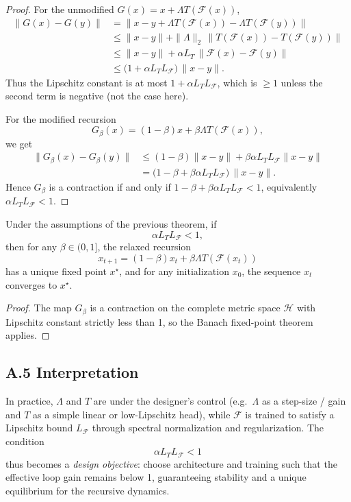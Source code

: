 \documentclass[11pt]{article}
\begin{document}
\begin{proof}
For the unmodified \(G(x) = x + \Lambda T(\mathcal{F}(x))\),
\begin{align*}
  \|G(x) - G(y)\|
  &= \|x-y + \Lambda T(\mathcal{F}(x)) - \Lambda T(\mathcal{F}(y))\| \\
  &\leq \|x-y\|
    + \|\Lambda\|_2 \,\|T(\mathcal{F}(x)) - T(\mathcal{F}(y))\| \\
  &\leq \|x-y\|
    + \alpha L_T \,\|\mathcal{F}(x) - \mathcal{F}(y)\| \\
  &\leq \big(1 + \alpha L_T L_{\mathcal{F}}\big)\,\|x-y\|.
\end{align*}
Thus the Lipschitz constant is at most \(1 + \alpha L_T L_{\mathcal{F}}\), which is \(\geq 1\) unless the second term is negative (not the case here).

For the modified recursion
\[
  G_\beta(x) = (1-\beta)x + \beta \Lambda T(\mathcal{F}(x)),
\]
we get
\begin{align*}
  \|G_\beta(x) - G_\beta(y)\|
  &\leq (1-\beta)\|x-y\|
    + \beta \alpha L_T L_{\mathcal{F}} \|x-y\| \\
  &= \bigl(1-\beta + \beta \alpha L_T L_{\mathcal{F}}\bigr)\,\|x-y\|.
\end{align*}
Hence \(G_\beta\) is a contraction if and only if
\(1-\beta + \beta \alpha L_T L_{\mathcal{F}} < 1\),
equivalently \(\alpha L_T L_{\mathcal{F}} < 1\).
\end{proof}

\begin{corollary}
Under the assumptions of the previous theorem, if
\[
  \alpha L_T L_{\mathcal{F}} < 1,
\]
then for any \(\beta \in (0,1]\), the relaxed recursion
\[
  x_{t+1} = (1-\beta)x_t + \beta \Lambda T(\mathcal{F}(x_t))
\]
has a unique fixed point \(x^\star\), and for any initialization \(x_0\), the sequence \(x_t\) converges to \(x^\star\).
\end{corollary}

\begin{proof}
The map \(G_\beta\) is a contraction on the complete metric space \(\mathcal{H}\) with Lipschitz constant strictly less than 1, so the Banach fixed-point theorem applies.
\end{proof}

\subsection*{A.5 Interpretation}

In practice, \(\Lambda\) and \(T\) are under the designer's control (e.g.\ \(\Lambda\) as a step-size / gain and \(T\) as a simple linear or low-Lipschitz head), while \(\mathcal{F}\) is trained to satisfy a Lipschitz bound \(L_{\mathcal{F}}\) through spectral normalization and regularization.
The condition
\[
  \alpha L_T L_{\mathcal{F}} < 1
\]
thus becomes a \emph{design objective}: choose architecture and training such that the effective loop gain remains below 1, guaranteeing stability and a unique equilibrium for the recursive dynamics.

\nocite{*}
  

\end{document}
